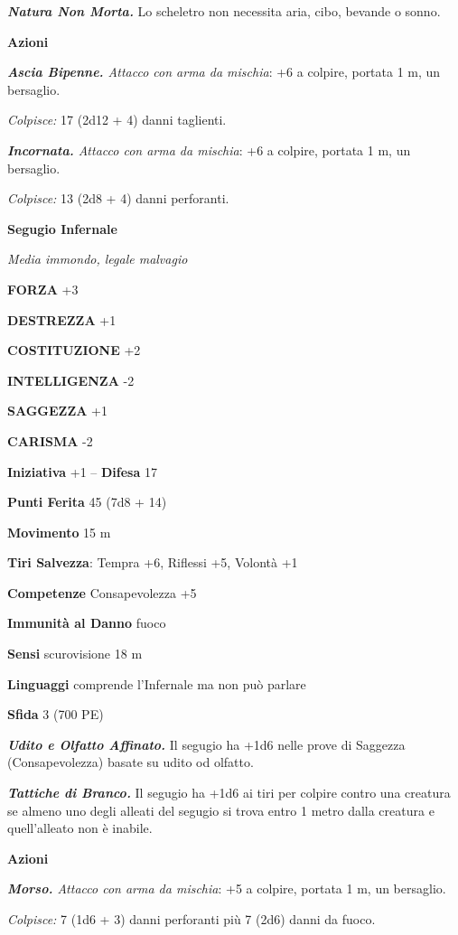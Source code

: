 \begin{multicols}{2}
\emph{\textbf{Natura Non Morta.}} Lo scheletro non necessita aria, cibo, bevande o sonno.

\textbf{Azioni}

\emph{\textbf{Ascia Bipenne.} Attacco con arma da mischia}: +6 a
colpire, portata 1 m, un bersaglio.

\emph{Colpisce:} 17 (2d12 + 4) danni taglienti.

\emph{\textbf{Incornata.} Attacco con arma da mischia}: +6 a colpire,
portata 1 m, un bersaglio.

\emph{Colpisce:} 13 (2d8 + 4) danni perforanti.

\medskip{}\textbf{Segugio Infernale}

\emph{Media immondo, legale malvagio}

\textbf{FORZA} +3

\textbf{DESTREZZA} +1

\textbf{COSTITUZIONE} +2

\textbf{INTELLIGENZA} -2

\textbf{SAGGEZZA} +1

\textbf{CARISMA} -2

\textbf{Iniziativa} +1 -- \textbf{Difesa} 17

\textbf{Punti Ferita} 45 (7d8 + 14)

\textbf{Movimento} 15 m

\textbf{Tiri Salvezza}: Tempra +6, Riflessi +5, Volontà +1

\textbf{Competenze} Consapevolezza +5

\textbf{Immunità al Danno} fuoco

\textbf{Sensi} scurovisione 18 m

\textbf{Linguaggi} comprende l'Infernale ma non può parlare

\textbf{Sfida} 3 (700 PE)

\emph{\textbf{Udito e Olfatto Affinato.}} Il segugio ha +1d6 nelle prove di Saggezza (Consapevolezza) basate su udito od olfatto.

\emph{\textbf{Tattiche di Branco.}} Il segugio ha +1d6 ai tiri per colpire contro una creatura se almeno uno degli alleati del segugio si trova entro 1 metro dalla creatura e quell'alleato non è inabile.

\textbf{Azioni}

\emph{\textbf{Morso.} Attacco con arma da mischia}: +5 a colpire,
portata 1 m, un bersaglio.

\emph{Colpisce:} 7 (1d6 + 3) danni perforanti più 7 (2d6) danni da
fuoco.


\end{multicols}
